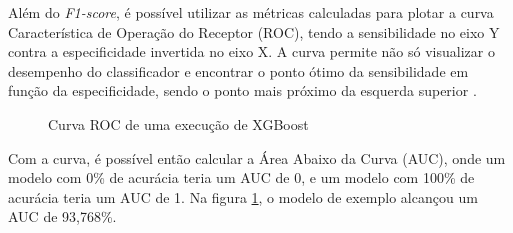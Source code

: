 Além do \textit{F1-score}, é possível utilizar as métricas calculadas para plotar a curva Característica de Operação do Receptor (ROC), tendo a sensibilidade no eixo Y contra a especificidade invertida no eixo X. A curva permite não só visualizar o desempenho do classificador e encontrar o ponto ótimo da sensibilidade em função da especificidade, sendo o ponto mais próximo da esquerda superior \cite{roc}.

\begin{figure}[ht!]
  \centering
  \caption{\textmd{Curva ROC de uma execução de XGBoost}}
  \label{fig:curva-roc-exemplo}
\end{figure}

Com a curva, é possível então calcular a Área Abaixo da Curva (AUC), onde um modelo com 0\% de acurácia teria um AUC de 0, e um modelo com 100\% de acurácia teria um AUC de 1. Na figura \ref{fig:curva-roc-exemplo}, o modelo de exemplo alcançou um AUC de 93,768\%.